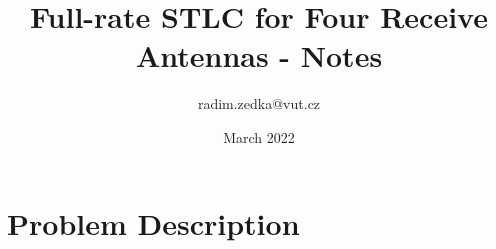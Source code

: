 \documentclass{article}
\begin{document}
\newcommand{\diag}{\operatorname{diag}}
\newcommand{\E}{\operatorname{E}} %
\newcommand{\tr}{\operatorname{tr}} %
\newcommand{\iDFT}{\operatorname{IDFT}} %
\newcommand{\DFT}{\operatorname{DFT}} %
\newcommand{\iFFT}{\operatorname{IFFT}} %
\newcommand{\iSFFT}{\operatorname{ISFFT}} %
\newcommand{\SFFT}{\operatorname{SFFT}} %
\newcommand{\FFT}{\operatorname{FFT}} %
\newcommand{\suma}{\operatorname{sum}} %

\title{Full-rate STLC for Four Receive Antennas - Notes }
\author{radim.zedka@vut.cz }
\date{March 2022}
\maketitle


\section{Problem Description}
\end{document}
